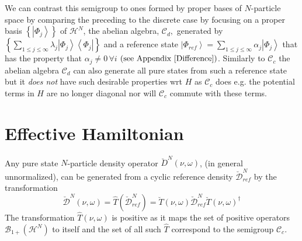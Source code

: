 \documentclass[aps,preprint]{revtex4}%
\begin{document}
We can contrast this semigroup to ones formed by proper bases of $N$-particle
space by comparing the preceding to the discrete case by focusing on a proper
basis $\left\{  \left\vert \Phi_{j}\right\rangle \right\}  $ of $\mathcal{H}%
^{N}$, the abelian algebra, $\mathcal{C}_{d},$ generated by $\left\{
{\textstyle\sum\limits_{1\leq j\leq\infty}}
\lambda_{j}\left\vert \Phi_{j}\right\rangle \left\langle \Phi_{j}\right\vert
\right\}  $ and a reference state $\left\vert \Phi_{ref}\right\rangle =%
{\textstyle\sum\limits_{1\leq j\leq\infty}}
\alpha_{j}\left\vert \Phi_{j}\right\rangle $ that has the property that
$\alpha_{j}\neq0\,\forall i$ $\left(  \text{see Appendix \ref{Difference}%
}\right)  $. Similarly to $\mathcal{C}_{c}$ the abelian algebra $\mathcal{C}%
_{d}$ can also generate all pure states from such a reference state but it
\emph{does not }have such desirable properties wrt $H$ as $\mathcal{C}_{c}$
does e.g. the potential terms in $H$ are no longer diagonal nor will
$\mathcal{C}_{c}$ commute with these terms.

\section{Effective Hamiltonian\label{EffHam}}

Any pure state $N$-particle density operator $\breve{D}^{N}\left(  \nu
,\omega\right)  $, (in general unnormalized), can be generated from a cyclic
reference density $\mathcal{\breve{D}}_{ref}^{N}$ by the transformation
\begin{equation}
\mathcal{\breve{D}}^{N}\left(  \nu,\omega\right)  =\hat{T}\left(
\mathcal{\breve{D}}_{ref}^{N}\right)  =\breve{T}\left(  \nu,\omega\right)
\mathcal{\breve{D}}_{ref}^{N}\breve{T}\left(  \nu,\omega\right)  ^{\dagger}%
\end{equation}
The transformation $\hat{T}\left(  \nu,\omega\right)  $ is positive as it maps
the set of positive operators $\mathcal{B}_{1+}\left(  \mathcal{H}^{N}\right)
$ to itself and the set of all such $\hat{T}$ correspond to the semigroup
$\mathcal{C}_{c}$.
\end{document}
